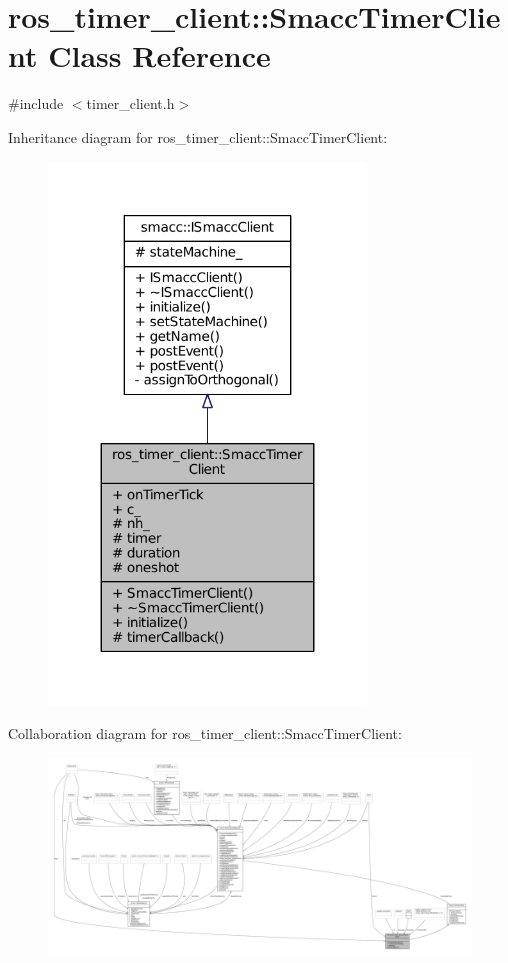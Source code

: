 \hypertarget{classros__timer__client_1_1SmaccTimerClient}{}\section{ros\+\_\+timer\+\_\+client\+:\+:Smacc\+Timer\+Client Class Reference}
\label{classros__timer__client_1_1SmaccTimerClient}


{\ttfamily \#include $<$timer\+\_\+client.\+h$>$}



Inheritance diagram for ros\+\_\+timer\+\_\+client\+:\+:Smacc\+Timer\+Client\+:
\nopagebreak
\begin{figure}[H]
\begin{center}
\leavevmode
\includegraphics[width=239pt]{classros__timer__client_1_1SmaccTimerClient__inherit__graph}
\end{center}
\end{figure}


Collaboration diagram for ros\+\_\+timer\+\_\+client\+:\+:Smacc\+Timer\+Client\+:
\nopagebreak
\begin{figure}[H]
\begin{center}
\leavevmode
\includegraphics[width=350pt]{classros__timer__client_1_1SmaccTimerClient__coll__graph}
\end{center}
\end{figure}

